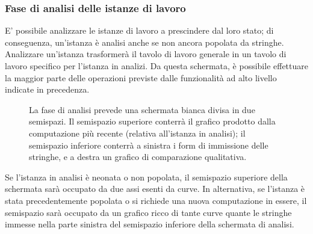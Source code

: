 \subsubsection{Fase di analisi delle istanze di lavoro}

E' possibile analizzare le istanze di lavoro a prescindere dal loro stato; di conseguenza, un'istanza è analisi anche se non ancora popolata da stringhe. Analizzare un'istanza trasformerà il tavolo di lavoro generale in un tavolo di lavoro specifico per l'istanza in analizi. Da questa schermata, è possibile effettuare la maggior parte delle operazioni previste dalle funzionalità ad alto livello indicate in precedenza.

\begin{figure}[ht!]
    \centering
    \caption{La fase di analisi prevede una schermata bianca divisa in due semispazi. Il semispazio superiore conterrà il grafico prodotto dalla computazione più recente (relativa all'istanza in analisi); il semispazio inferiore conterrà a sinistra i form di immissione delle stringhe, e a destra un grafico di comparazione qualitativa.}
    \label{fig:esempio}
\end{figure}

Se l'istanza in analisi è neonata o non popolata, il semispazio superiore della schermata sarà occupato da due assi esenti da curve. In alternativa, se l'istanza è stata precedentemente popolata o si richiede una nuova computazione in essere, il semispazio sarà occupato da un grafico ricco di tante curve quante le stringhe immesse nella parte sinistra del semispazio inferiore della schermata di analisi.

